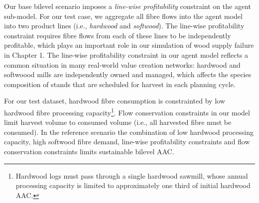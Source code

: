 
Our base bilevel scenario imposes a \emph{line-wise profitability} constraint on the agent sub-model. For our test case, we aggregate all fibre flows into the agent model into two product lines (i.e., \emph{hardwood} and \emph{softwood}). The line-wise profitability constraint requires fibre flows from each of these lines to be independently profitable, which  plays an important role in our simulation of wood supply failure in Chapter 1. The line-wise profitability constraint in our agent model reflects a common situation in many real-world value creation networks: hardwood and softwoood mills are independently owned and managed, which affects the species composition of stands that are scheduled for harvest in each planning cycle.  

For our test dataset, hardwood fibre consumption is constrainted by low hardwood fibre processing capacity\footnote{Hardwood logs must pass through a single hardwood sawmill, whose annual processing capacity is limited to approximately one third of initial hardwood AAC.}. Flow conservation constraints in our model limit harvest volume to consumed volume (i.e., all harvested fibre must be consumed). In the reference scenario the combination of low hardwood processing capacity, high softwood fibre demand, line-wise profitability constraints and flow conservation constraints limits sustainable bilevel AAC. 



